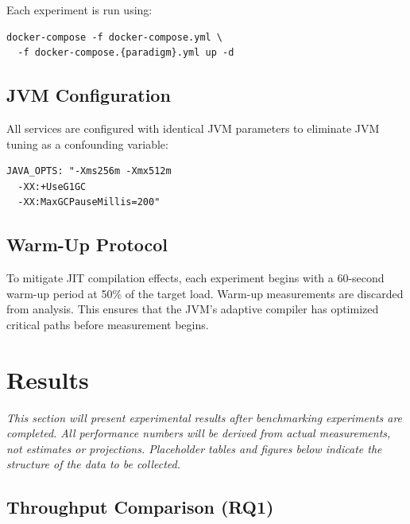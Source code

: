 \documentclass[journal]{IEEEtran}
\begin{document}
Each experiment is run using:
\begin{lstlisting}[style=yamlstyle]
docker-compose -f docker-compose.yml \
  -f docker-compose.{paradigm}.yml up -d
\end{lstlisting}

\subsection{JVM Configuration}
\label{subsec:jvm}

All services are configured with identical JVM parameters to eliminate JVM tuning as a confounding variable:

\begin{lstlisting}[style=yamlstyle]
JAVA_OPTS: "-Xms256m -Xmx512m 
  -XX:+UseG1GC 
  -XX:MaxGCPauseMillis=200"
\end{lstlisting}

\subsection{Warm-Up Protocol}
\label{subsec:warmup}

To mitigate JIT compilation effects, each experiment begins with a 60-second warm-up period at 50\% of the target load. Warm-up measurements are discarded from analysis. This ensures that the JVM's adaptive compiler has optimized critical paths before measurement begins.


\section{Results}
\label{sec:results}


\textit{This section will present experimental results after benchmarking experiments are completed. All performance numbers will be derived from actual measurements, not estimates or projections. Placeholder tables and figures below indicate the structure of the data to be collected.}

\subsection{Throughput Comparison (RQ1)}
\label{subsec:results_throughput}
\end{document}
